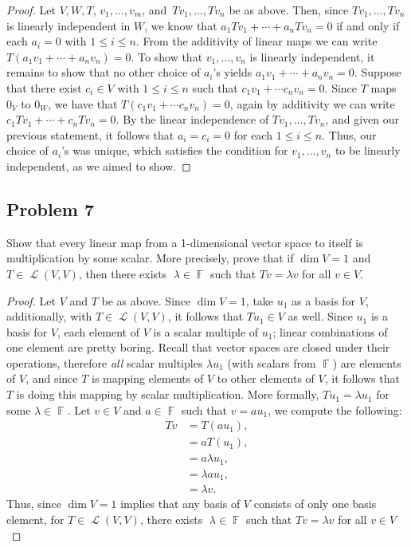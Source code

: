 \documentclass[letterpaper, 12pt]{amsart}
\DeclareMathOperator{\F}{\mathbb{F}}				%
\DeclareMathOperator{\Ell}{\mathscr{L}}				%
\theoremstyle{definition}  							%
\begin{document}
		\begin{proof}
		Let $V,W,T$, $v_{1}, \dots, v_{m}$, and $\, Tv_{1}, \dots, Tv_{n}$ be as above.
		Then, since $Tv_{1}, \dots, Tv_{n}$ is linearly independent in $W$, we know that $a_{1}Tv_{1} + \cdots + a_{n}Tv_{n} = 0$ if and only if each $a_{i} = 0$ with $1 \leq i \leq n$.
		From the additivity of linear maps we can write $T(a_{1}v_{1} + \cdots + a_{n}v_{n}) = 0$.
		To show that $v_{1}, \dots, v_{n}$ is linearly independent, it remains to show that no other choice of $a_{i}$'s yields $a_{1}v_{1} + \cdots + a_{n}v_{n} = 0$.
		Suppose that there exist $c_{i} \in V$ with $1 \leq i \leq n$ such that $c_{1}v_{1} + \cdots c_{n}v_{n} = 0$.
		Since $T$ maps $0_{V}$ to $0_{W}$, we have that $T(c_{1}v_{1} + \cdots c_{n}v_{n}) = 0$, again by additivity we can write $c_{1}Tv_{1} + \cdots + c_{n}Tv_{n} = 0$.
		By the linear independence of $Tv_{1}, \dots, Tv_{n}$, and given our previous statement, it follows that $a_{i} = c_{i} = 0$ for each $1 \leq i \leq n$.
		Thus, our choice of $a_{i}$'s was unique, which satisfies the condition for $v_{1}, \dots, v_{n}$ to be linearly independent, as we aimed to show.
		\end{proof}

		\subsection*{Problem 7}
		Show that every linear map from a 1-dimensional vector space to itself is multiplication by some scalar. 
		More precisely, prove that if $\dim V = 1$ and $T \in \Ell(V,V)$, then there exists 􏰀$\lambda \in \F$ such that $Tv = \lambda v$ for all $v \in V$.

		\begin{proof}
		Let $V$ and $T$ be as above.
		Since $\dim V = 1$, take $u_{1}$ as a basis for $V$, additionally, with $T \in \Ell(V,V)$, it follows that $Tu_{1} \in V$ as well.
		Since $u_{1}$ is a basis for $V$, each element of $V$ is a scalar multiple of $u_{1}$; linear combinations of one element are pretty boring.
		Recall that vector spaces are closed under their operations, therefore \textit{all} scalar multiples $\lambda u_{1}$ (with scalars from $\F$) are elements of $V$, and since $T$ is mapping elements of $V$ to other elements of $V$, it follows that $T$ is doing this mapping by scalar multiplication.
		More formally, $Tu_{1} = \lambda u_{1}$ for some $\lambda \in \F$.
		Let $v \in V$ and $a \in \F$ such that $v = a u_{1}$, we compute the following:
			\begin{align*}
				Tv &= T(au_{1}), \\
				&= a T(u_{1}), \\
				&= a \lambda u_{1}, \\
				&= \lambda a u_{1}, \\
				&= \lambda v.
			\end{align*}
		Thus, since $\dim V = 1$ implies that any basis of $V$ consists of only one basis element, for $T \in \Ell(V,V)$, there exists 􏰀$\lambda \in \F$ such that $Tv = \lambda v$ for all $v \in V$
		\end{proof}
\end{document}
